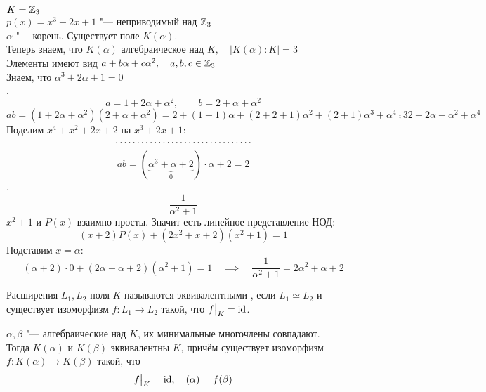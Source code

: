 \begin{eg}
	$ K = \mathbb{Z}_3 $ \\
	$ p(x) = x^3 + 2x + 1 $ "--- неприводимый над $ \mathbb{Z}_3 $ \\
	$ \alpha $ "--- корень. Существует поле $ K(\alpha) $. \\
	Теперь знаем, что $ K(\alpha) $ алгебраическое над $ K, \quad |K(\alpha) : K| = 3 $ \\
	Элементы имеют вид $ a + b\alpha + c\alpha^2, \quad a, b, c \in \mathbb{Z}_3 $ \\
	Знаем, что $ \alpha^3 + 2\alpha + 1 = 0 $ \\
	.
	$$ a = 1 + 2\alpha + \alpha^2, \qquad b = 2 + \alpha + \alpha^2 $$
	$$ ab = (1 + 2\alpha + \alpha^2)(2 + \alpha + \alpha^2) = 2 + (1 + 1) \alpha + (2 + 2 + 1)\alpha^2 + (2 + 1)\alpha^3 + \alpha^4 \comp3 2 + 2\alpha + \alpha^2 + \alpha^4 $$
	Поделим $ x^4 + x^2 + 2x + 2 $ на $ x^3 + 2x + 1 $:
	$$ \widedots[5cm] $$
	$$ ab = (\underbrace{\alpha^3 + \alpha + 2}_0) \cdot \alpha + 2 = 2 $$
	.
	$$ \frac1{\alpha^2 + 1} $$
	$ x^2 + 1 $ и $ P(x) $ взаимно просты. Значит есть линейное представление НОД:
	$$ (x + 2)P(x) + (2x^2 + x + 2)(x^2 + 1) = 1 $$
	Подставим $ x = \alpha $:
	$$ (\alpha + 2) \cdot 0 + (2\alpha + \alpha + 2)(\alpha^2 + 1) = 1 \quad \implies \quad \frac1{\alpha^2 + 1} = 2\alpha^2 + \alpha + 2 $$
\end{eg}

\begin{definition}
	Расширения $ L_1, L_2 $ поля $ K $ называются эквивалентными \nimp[(относительно $ K $)], если $ L_1 \simeq L_2 $ и существует изоморфизм $ f : L_1 \to L_2 $ такой, что $ f\big|_{K}^{} = \operatorname{id} $.
\end{definition}

\begin{theorem}
	$ \alpha, \beta $ "--- алгебраические над $ K $, их минимальные многочлены совпадают. \\
	Тогда $ K(\alpha) $ и $ K(\beta) $ эквивалентны $ K $, причём существует изоморфизм $ f : K(\alpha) \to K(\beta) $ такой, что
	$$ f\big|_{K}^{} = \operatorname{id}, \quad (\alpha) = f(\beta) $$
\end{theorem}

